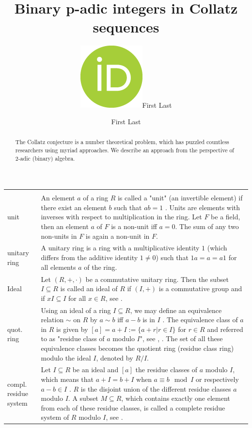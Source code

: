\documentclass[12pt]{amsart}
\title[Binary p-adic integers in Collatz Sequences]{Binary p-adic integers in Collatz sequences}
\author[F.\ Last1]{\href{https://orcid.org/0000-0000-0000-0000}{\includegraphics[scale=0.06]{orcid.png}}\hspace{1mm}First Last}
\author[F.\ Last2]{First Last}
\theoremstyle{definition}
\begin{document}
	
\begingroup
\let\MakeUppercase\relax
\maketitle
\endgroup

\begin{abstract}
The Collatz conjecture is a number theoretical problem, which has puzzled countless researchers using myriad approaches. We describe an approach from the perspective of 2-adic (binary) algebra.
\end{abstract}

\newpage
{\renewcommand{\arraystretch}{1.8}
\begin{table}[H]
	\centering
	\begin{tabular}{|P{1.4cm} p{13.4cm}|}
		\hline
		\\
		unit & An element $a$ of a ring $R$ is called a "unit" (an invertible element) if there exist an element $b$ such that $ab=1$ \cite[p.~24]{Ref_Northcott_1953}. Units are elements with inverses with respect to multiplication in the ring. Let $F$ be a field, then an element $a$ of $F$ is a non-unit iff $a=0$. The sum of any two non-units in $F$ is again a non-unit in $F$.
		\\
		unitary ring & A unitary ring is a ring with a multiplicative identity $1$ (which differs from the additive identity $1\ne0$) such that $1a=a=a1$ for all elements $a$ of the ring.
		\\
		Ideal & Let $(R,+,\cdot)$ be a commutative unitary ring. Then the subset $I\subseteq R$ is called an ideal of $R$ if $(I,+)$ is a commutative group and if $xI\subseteq I$ for all $x\in R$, see \cite[p.~66-67]{Ref_Wolfart_2011}.
		\\
		quot. ring & Using an ideal of a ring $I\subseteq R$, we may define an equivalence relation $\sim$ on $R$ by $a\sim b$ iff $a-b$ is in $I$ \cite[p.~69]{Ref_Schulze-Pillot_2015}. The equivalence class of $a$ in $R$ is given by $[a]=a+I:=\{a+r|r\in I\}$ for $r\in R$ and referred to as "residue class of $a$ modulo $I$", see \cite[p.~120]{Ref_Schubert_2009}, \cite[p.~70]{Ref_Schulze-Pillot_2015}. The set of all these equivalence classes becomes the quotient ring (residue class ring) modulo the ideal $I$, denoted by $R/I$.
		\\
		compl. residue system & Let $I\subseteq R$ be an ideal and $[a]$ the residue classes of $a$ modulo $I$, which means that $a+I=b+I$ when $a\equiv b\mod I$ or respectively $a-b\in I$ \cite[p.~70]{Ref_Schulze-Pillot_2015}. $R$ is the disjoint union of the different residue classes $a$ modulo $I$. A subset $M\subseteq R$, which contains exactly one element from each of these residue classes, is called a complete residue system of $R$ modulo $I$, see \cite[p.~70]{Ref_Schulze-Pillot_2015}.

\end{tabular}
\end{table}}
\end{document}
